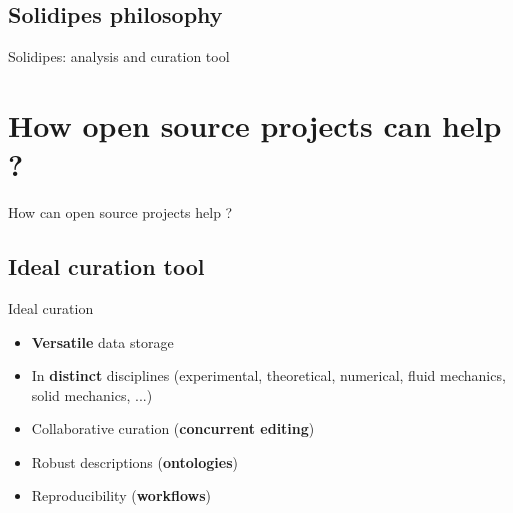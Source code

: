 \documentclass[10pt,compress,serif,aspectratio=169]{beamer}
\begin{document}
\subsection{Solidipes philosophy}
\begin{frame}{ Solidipes: analysis and curation tool}
\end{frame}




\section{How open source projects can help ?}

\begin{frame}[t]
  \begin{center}
  \vspace{2cm}
  {\huge How can open source projects help ?}\\
  \end{center}
\end{frame}


\subsection{Ideal curation tool}
\begin{frame}[t]{Ideal curation}
  \vspace{1.5cm}
    {\large
  \begin{itemize}
    \item \textbf{Versatile} data storage
    \item In \textbf{distinct} disciplines (experimental, theoretical, numerical, fluid mechanics, solid mechanics, ...)
    \item Collaborative curation (\textbf{concurrent editing})
    \item Robust descriptions (\textbf{ontologies})
    \item Reproducibility (\textbf{workflows})
\end{itemize}
}
\end{frame}
\end{document}

